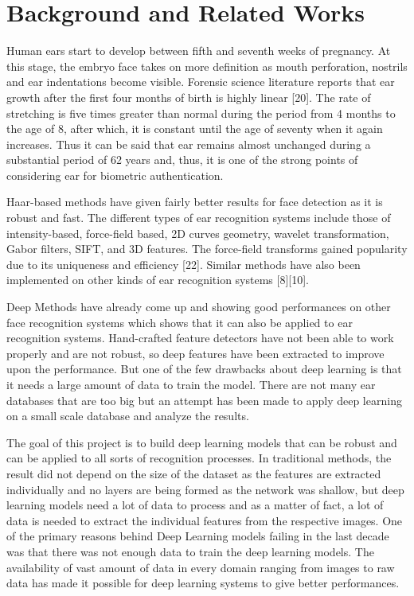 \chapter{Background and Related Works}
\label{sec:back}

Human ears start to develop between fifth and seventh weeks of pregnancy. At this stage, the embryo face takes on more definition as mouth perforation, nostrils and ear indentations become visible. Forensic science literature reports that ear growth after the first four months of birth is highly linear [20]. The rate of stretching is five times greater than normal during the period from 4 months to the age of 8, after which, it is constant until the age of seventy when it again increases. Thus it can be said that ear remains almost unchanged during a substantial period of 62 years and, thus, it is one of the strong points of considering ear for biometric authentication.

Haar-based methods have given fairly better results for face detection as it is robust and fast. The different types of ear recognition systems include those of intensity-based, force-field based, 2D curves geometry, wavelet transformation, Gabor filters, SIFT, and 3D features. The force-field transforms gained popularity due to its uniqueness and efficiency [22]. Similar methods have also been implemented on other kinds of ear recognition systems [8][10].

Deep Methods have already come up and showing good performances on other face recognition systems which shows that it can also be applied to ear recognition systems. Hand-crafted feature detectors have not been able to work properly and are not robust, so deep features have been extracted to improve upon the performance. But one of the few drawbacks about deep learning is that it needs a large amount of data to train the model. There are not many ear databases that are too big but an attempt has been made to apply deep learning on a small scale database and analyze the results.

The goal of this project is to build deep learning models that can be robust and can be applied to all sorts of recognition processes. In traditional methods, the result did not depend on the size of the dataset as the features are extracted individually and no layers are being formed as the network was shallow, but deep learning models need a lot of data to process and as a matter of fact, a lot of data is needed to extract the individual features from the respective images. One of the primary reasons behind Deep Learning models failing in the last decade was that there was not enough data to train the deep learning models. The availability of vast amount of data in every domain ranging from images to raw data has made it possible for deep learning systems to give better performances.

